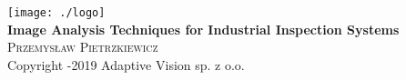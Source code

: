 \newcommand{\coverPage}[3]
{
	\begin{titlingpage}
	\begin{center}


	\texttt{[image: ./logo]}\\[5cm]    





	{ \huge \bfseries #2}\\[0.4cm]

	\textsc{\Large #1}\\[0.5cm]
	\null
	\vfill
	{\small #3}
	\end{center}
	\end{titlingpage}



	\thispagestyle{empty}	
	\newpage
}


\coverPage
{Przemys\l aw Pietrzkiewicz}
{Image Analysis Techniques for Industrial Inspection Systems}
{Copyright \textcopyright 2012-2019 Adaptive Vision sp. z o.o.}
